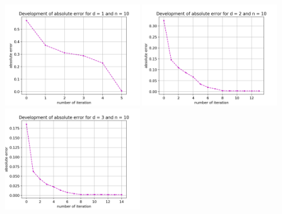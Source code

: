 \documentclass{scrartcl}
\begin{document}
{
  \centering
    \includegraphics[width=0.45\textwidth]{Grafiken/iterates_d1_n10}
    \includegraphics[width=0.45\textwidth]{Grafiken/iterates_d2_n10}
    \includegraphics[width=0.45\textwidth]{Grafiken/iterates_d3_n10}
    \vspace{-0.2cm}
}
\vspace{0.5cm}
\end{document}
